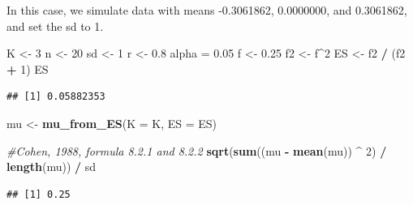 \documentclass[]{book}
\newenvironment{Shaded}{\begin{snugshade}}{\end{snugshade}}
\newcommand{\CommentTok}[1]{\textcolor[rgb]{0.56,0.35,0.01}{\textit{#1}}}
\newcommand{\DataTypeTok}[1]{\textcolor[rgb]{0.13,0.29,0.53}{#1}}
\newcommand{\DecValTok}[1]{\textcolor[rgb]{0.00,0.00,0.81}{#1}}
\newcommand{\FloatTok}[1]{\textcolor[rgb]{0.00,0.00,0.81}{#1}}
\newcommand{\KeywordTok}[1]{\textcolor[rgb]{0.13,0.29,0.53}{\textbf{#1}}}
\newcommand{\NormalTok}[1]{#1}
\newcommand{\OperatorTok}[1]{\textcolor[rgb]{0.81,0.36,0.00}{\textbf{#1}}}
\newcommand{\StringTok}[1]{\textcolor[rgb]{0.31,0.60,0.02}{#1}}
\begin{document}
In this case, we simulate data with means -0.3061862, 0.0000000, and 0.3061862, and set the sd to 1.

\begin{Shaded}
\begin{Highlighting}[]
\NormalTok{K <-}\StringTok{ }\DecValTok{3}
\NormalTok{n <-}\StringTok{ }\DecValTok{20}
\NormalTok{sd <-}\StringTok{ }\DecValTok{1}
\NormalTok{r <-}\StringTok{ }\FloatTok{0.8}
\NormalTok{alpha =}\StringTok{ }\FloatTok{0.05}
\NormalTok{f <-}\StringTok{ }\FloatTok{0.25}
\NormalTok{f2 <-}\StringTok{ }\NormalTok{f}\OperatorTok{^}\DecValTok{2}
\NormalTok{ES <-}\StringTok{ }\NormalTok{f2 }\OperatorTok{/}\StringTok{ }\NormalTok{(f2 }\OperatorTok{+}\StringTok{ }\DecValTok{1}\NormalTok{)}
\NormalTok{ES}
\end{Highlighting}
\end{Shaded}

\begin{verbatim}
## [1] 0.05882353
\end{verbatim}

\begin{Shaded}
\begin{Highlighting}[]
\NormalTok{mu <-}\StringTok{ }\KeywordTok{mu_from_ES}\NormalTok{(}\DataTypeTok{K =}\NormalTok{ K, }\DataTypeTok{ES =}\NormalTok{ ES)}

\CommentTok{#Cohen, 1988, formula 8.2.1 and 8.2.2}
\KeywordTok{sqrt}\NormalTok{(}\KeywordTok{sum}\NormalTok{((mu }\OperatorTok{-}\StringTok{ }\KeywordTok{mean}\NormalTok{(mu)) }\OperatorTok{^}\StringTok{ }\DecValTok{2}\NormalTok{) }\OperatorTok{/}\StringTok{ }\KeywordTok{length}\NormalTok{(mu)) }\OperatorTok{/}\StringTok{ }\NormalTok{sd }
\end{Highlighting}
\end{Shaded}

\begin{verbatim}
## [1] 0.25
\end{verbatim}
\end{document}
